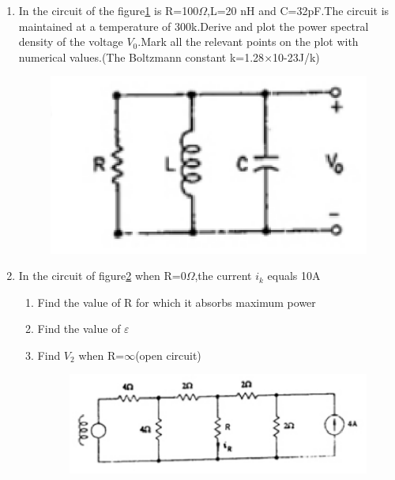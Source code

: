 \documentclass[journal,12pt,twocolumn]{IEEEtran}
\begin{document}
\begin{enumerate}
\item In the circuit of the figure\ref{fig18} is R=100$\Omega$,L=20 nH and C=32pF.The circuit is maintained at a temperature of 300k.Derive and plot the power spectral density of the voltage $V_{0}$.Mark all the relevant points on the plot with numerical values.(The Boltzmann constant k=1.28$\times$10-23J/k)
\begin{figure}[!h]
\begin{center}
\includegraphics[scale=0.5]{./figs/fig18.eps}
\caption{}
\label{fig18}
\end{center}  
\end{figure}


\item In the circuit of figure\ref{fig19} when R=0$\Omega$,the current $i_{k}$ equals 10A
\begin{enumerate}
\setlength\itemsep{2em}
\item Find the value of R for which it absorbs maximum power
\item Find the value of $\varepsilon$
\item Find $V_{2}$ when R=$\infty$(open circuit)
\begin{figure}[!h]
\begin{center}
\includegraphics[scale=0.5]{./figs/fig19.eps}
\caption{}
\label{fig19}
\end{center}
\end{figure}
\end{enumerate}



\end{enumerate}
\end{document}
